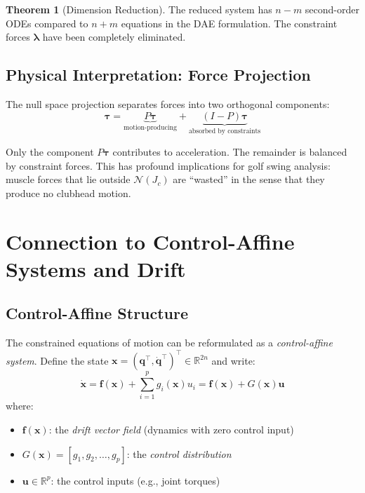 \documentclass[11pt,a4paper]{article}
\theoremstyle{definition}
\newtheorem{theorem}{Theorem}[section]
\newcommand{\R}{\mathbb{R}}
\newcommand{\nullspace}{\mathcal{N}}
\newcommand{\Jc}{J_c}
\newcommand{\qvec}{\bm{q}}
\newcommand{\xvec}{\bm{x}}
\newcommand{\uvec}{\bm{u}}
\newcommand{\fvec}{\bm{f}}
\newcommand{\lambdavec}{\bm{\lambda}}
\newcommand{\tauvec}{\bm{\tau}}
\begin{document}
\begin{theorem}[Dimension Reduction]
The reduced system has $n - m$ second-order ODEs compared to $n + m$ equations in the DAE formulation. The constraint forces $\lambdavec$ have been completely eliminated.
\end{theorem}

\subsection{Physical Interpretation: Force Projection}

The null space projection separates forces into two orthogonal components:
\begin{equation}
    \tauvec = \underbrace{P \tauvec}_{\text{motion-producing}} + \underbrace{(I - P) \tauvec}_{\text{absorbed by constraints}}
\end{equation}

Only the component $P\tauvec$ contributes to acceleration. The remainder is balanced by constraint forces. This has profound implications for golf swing analysis: muscle forces that lie outside $\nullspace(\Jc)$ are ``wasted'' in the sense that they produce no clubhead motion.

\section{Connection to Control-Affine Systems and Drift}

\subsection{Control-Affine Structure}

The constrained equations of motion can be reformulated as a \emph{control-affine system}. Define the state $\xvec = (\qvec^\top, \dot{\qvec}^\top)^\top \in \R^{2n}$ and write:
\begin{equation}
    \boxed{\dot{\xvec} = \fvec(\xvec) + \sum_{i=1}^{p} g_i(\xvec) u_i = \fvec(\xvec) + G(\xvec) \uvec}
\end{equation}
where:
\begin{itemize}[noitemsep]
    \item $\fvec(\xvec)$: the \emph{drift vector field} (dynamics with zero control input)
    \item $G(\xvec) = [g_1, g_2, \ldots, g_p]$: the \emph{control distribution}
    \item $\uvec \in \R^p$: the control inputs (e.g., joint torques)
\end{itemize}
\end{document}
